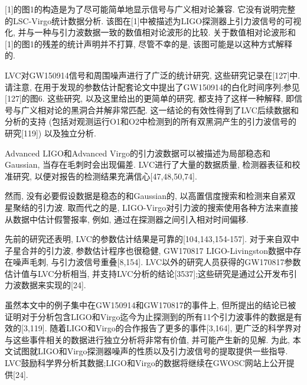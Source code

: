 \documentclass[a4paper]{\documentclassname}
\theoremstyle{definition}
\begin{document}
[1]的图1的构造是为了尽可能简单地显示信号与广义相对论兼容. 它没有说明完整的LSC-Virgo统计数据分析. 该图在[1]中被描述为LIGO探测器上引力波信号的可视化, 并与一种与引力波数据一致的数值相对论波形的比较. 关于数值相对论波形和[1]的图1的残差的统计声明并不打算, 尽管不幸的是, 该图可能是以这种方式解释的. 

LVC对GW150914信号和周围噪声进行了广泛的统计研究, 这些研究记录在[127]中. 请注意, 在用于发现的参数估计配套论文中提出了GW150914的白化时间序列;参见[127]的图6. 这些研究, 以及这里给出的更简单的研究, 都支持了这样一种解释, 即信号与广义相对论的黑洞合并解非常匹配. 这一结论的有效性得到了LVC后续数据和分析的支持 (包括对观测运行O1和O2中检测到的所有双黑洞产生的引力波信号的研究[119]) 以及独立分析. 

Advanced LIGO和Advanced Virgo的引力波数据可以被描述为局部稳态和Gaussian, 当存在毛刺时会出现偏差. LVC进行了大量的数据质量, 检测器表征和校准研究, 以便对报告的检测结果充满信心[47,48,50,74]. 

然而, 没有必要假设数据是稳态的和Gaussian的, 以高置信度搜索和检测来自紧双星聚结的引力波. 取而代之的是, LIGO-Virgo对引力波的搜索使用各种方法来直接从数据中估计假警报率, 例如, 通过在探测器之间引入相对时间偏移. 

先前的研究还表明, LVC的参数估计结果是可靠的[104,143,154-157]. 对于来自双中子星合并的引力波, 参数估计程序也很稳健, GW170817 LIGO-Livingston数据中存在噪声毛刺, 与引力波信号重叠[8,154]. LVC以外的研究人员获得的GW170817参数估计值与LVC分析相当, 并支持LVC分析的结论[3537];这些研究是通过公开发布引力波数据来实现的[24]. 

虽然本文中的例子集中在GW150914和GW170817的事件上, 但所提出的结论已被证明对于分析包含LIGO和Virgo迄今为止探测到的所有11个引力波事件的数据是有效的[3,119]. 随着LIGO和Virgo的合作报告了更多的事件[3,164], 更广泛的科学界对与这些事件相关的数据进行独立分析将非常有价值, 并可能产生新的见解. 为此, 本文试图就LIGO和Virgo探测器噪声的性质以及引力波信号的提取提供一些指导. LVC鼓励科学界分析其数据;LIGO和Virgo的数据将继续在GWOSC网站上公开提供[24]. 
\end{document}
